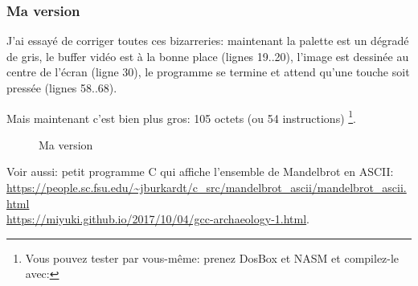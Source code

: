 \newcommand{\MyFixedVersion}{Ma version }
\subsubsection{\MyFixedVersion}




J'ai essayé de corriger toutes ces bizarreries: maintenant la palette est un dégradé
de gris, le buffer vidéo est à la bonne place (lignes 19..20),
l'image est dessinée au centre de l'écran (ligne 30), le programme se termine et
attend qu'une touche soit pressée (lignes 58..68).

Mais maintenant c'est bien plus gros: 105 octets (ou 54 instructions)
\footnote{
Vous pouvez tester par vous-même: prenez DosBox et NASM et compilez-le avec:
}.

\begin{figure}[H]
\centering
{}
\caption{\MyFixedVersion}
\label{fig:mandelbrot_fixed}
\end{figure}

Voir aussi: petit programme C qui affiche l'ensemble de Mandelbrot en ASCII:
\url{https://people.sc.fsu.edu/~jburkardt/c_src/mandelbrot_ascii/mandelbrot_ascii.html} \\
\url{https://miyuki.github.io/2017/10/04/gcc-archaeology-1.html}.
